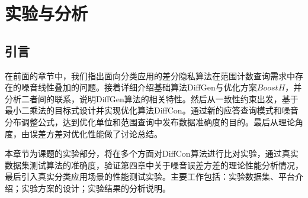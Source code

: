 
\raggedbottom
\chapter{实验与分析}
\label{chap:evaluation}









\section{引言}

在前面的章节中，我们指出面向分类应用的差分隐私算法在范围计数查询需求中存在的噪音线性叠加的问题。接着详细介绍基础算法DiffGen与优化方案$BoostH$，并分析二者间的联系，说明DiffGen算法的相关特性。然后从一致性约束出发，基于最小二乘法的目标式设计并实现优化算法DiffCon。通过新的应答查询模式和噪音分布调整公式，达到优化单位和范围查询中发布数据准确度的目的。最后从理论角度，由误差方差对优化性能做了讨论总结。

本章节为课题的实验部分，将在多个方面对DiffCon算法进行比对实验，通过真实数据集测试算法的准确度，验证第四章中关于噪音误差方差的理论性能分析情况，最后引入真实分类应用场景的性能测试实验。主要工作包括：实验数据集、平台介绍；实验方案的设计；实验结果的分析说明。

